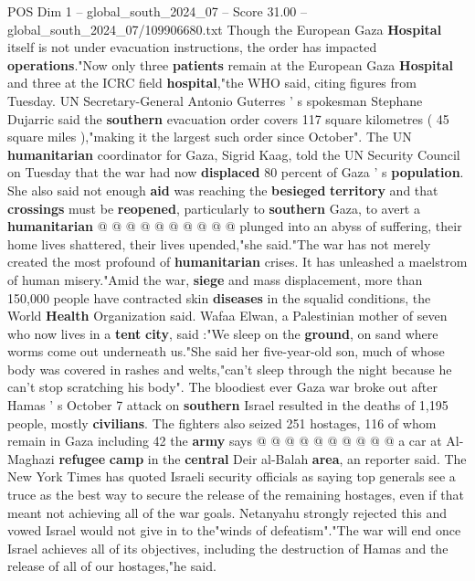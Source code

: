 \begin{textsample}{POS Dim 1 – global\_south\_2024\_07 – Score 31.00 – global\_south\_2024\_07/109906680.txt}
Though the European Gaza \textbf{Hospital} itself is not under evacuation instructions, the order has impacted \textbf{operations}."Now only three \textbf{patients} remain at the European Gaza \textbf{Hospital} and three at the ICRC field \textbf{hospital},"the WHO said, citing figures from Tuesday.
UN Secretary-General Antonio Guterres ' s spokesman Stephane Dujarric said the \textbf{southern} evacuation order covers 117 square kilometres ( 45 square miles ),"making it the largest such order since October".
The UN \textbf{humanitarian} coordinator for Gaza, Sigrid Kaag, told the UN Security Council on Tuesday that the war had now \textbf{displaced} 80 percent of Gaza ' s \textbf{population}.
She also said not enough \textbf{aid} was reaching the \textbf{besieged} \textbf{territory} and that \textbf{crossings} must be \textbf{reopened}, particularly to \textbf{southern} Gaza, to avert a \textbf{humanitarian} @ @ @ @ @ @ @ @ @ @ plunged into an abyss of suffering, their home lives shattered, their lives upended,"she said."The war has not merely created the most profound of \textbf{humanitarian} crises.
It has unleashed a maelstrom of human misery."Amid the war, \textbf{siege} and mass displacement, more than 150,000 people have contracted skin \textbf{diseases} in the squalid conditions, the World \textbf{Health} Organization said.
Wafaa Elwan, a Palestinian mother of seven who now lives in a \textbf{tent} \textbf{city}, said :"We sleep on the \textbf{ground}, on sand where worms come out underneath us."She said her five-year-old son, much of whose body was covered in rashes and welts,"can't sleep through the night because he can't stop scratching his body".
The bloodiest ever Gaza war broke out after Hamas ' s October 7 attack on \textbf{southern} Israel resulted in the deaths of 1,195 people, mostly \textbf{civilians}.
The fighters also seized 251 hostages, 116 of whom remain in Gaza including 42 the \textbf{army} says @ @ @ @ @ @ @ @ @ @ a car at Al-Maghazi \textbf{refugee} \textbf{camp} in the \textbf{central} Deir al-Balah \textbf{area}, an reporter said.
The New York Times has quoted Israeli security officials as saying top generals see a truce as the best way to secure the release of the remaining hostages, even if that meant not achieving all of the war goals.
Netanyahu strongly rejected this and vowed Israel would not give in to the"winds of defeatism"."The war will end once Israel achieves all of its objectives, including the destruction of Hamas and the release of all of our hostages,"he said.

\end{textsample}
